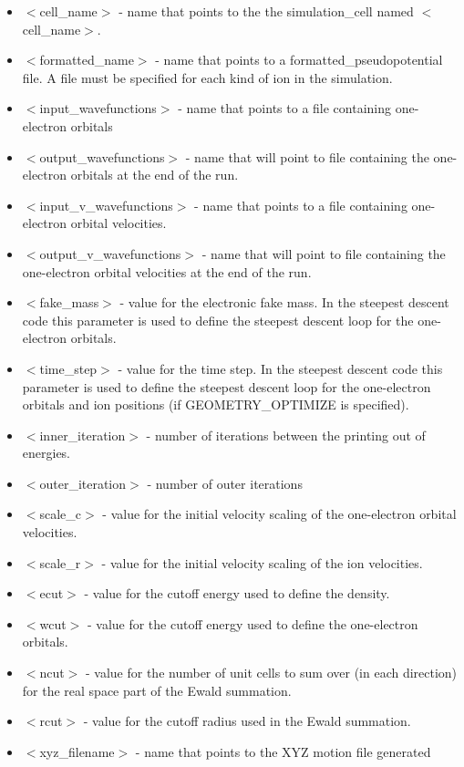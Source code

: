 \begin{itemize}
	\item $<$cell\_name$>$ - name that points to the
              the simulation\_cell named $<$cell\_name$>$.
	\item $<$formatted\_name$>$ - name that points
              to a formatted\_pseudopotential file.  A file must
              be specified for each kind of ion in the simulation.
	\item $<$input\_wavefunctions$>$ - name that points
              to a file containing one-electron orbitals
	\item $<$output\_wavefunctions$>$ - name that will
              point to file containing the one-electron orbitals at the
              end of the run. 
	\item $<$input\_v\_wavefunctions$>$ - name that points
              to a file containing one-electron orbital velocities.
	\item $<$output\_v\_wavefunctions$>$ - name that will
              point to file containing the one-electron orbital velocities
	      at the end of the run. 
	\item $<$fake\_mass$>$ - value for the electronic
              fake mass.  In the steepest descent code this parameter is
              used to define the steepest descent loop for the one-electron
              orbitals.
	\item $<$time\_step$>$ - value for the time step.
               In the steepest descent code this parameter is used to
               define the steepest descent loop for the one-electron orbitals
               and ion positions (if GEOMETRY\_OPTIMIZE is specified).
	\item $<$inner\_iteration$>$ - number of iterations between the
              printing out of energies.
	\item $<$outer\_iteration$>$ - number of outer iterations
 	\item $<$scale\_c$>$ - value for the initial velocity
			      scaling of the one-electron orbital velocities.
	\item $<$scale\_r$>$ - value for the initial velocity
			      scaling of the ion velocities.
	\item $<$ecut$>$ - value for the cutoff energy used
                           to define the density.
	\item $<$wcut$>$ - value for the cutoff energy used
 			   to define the one-electron orbitals.
	\item $<$ncut$>$ - value for the number of unit cells
 			  to sum over (in each direction) for the real space
			  part of the Ewald summation.
	\item $<$rcut$>$ - value for the cutoff radius used
			  in the Ewald summation.
	\item $<$xyz\_filename$>$ - name that points to the XYZ motion file
				generated
\end{itemize}



